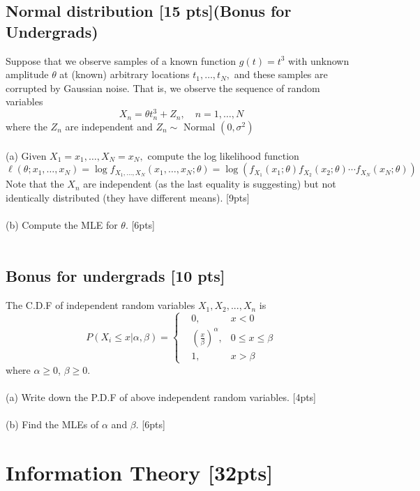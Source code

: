 \documentclass{article}
\begin{document}
\subsection{Normal distribution [15 pts](Bonus for Undergrads)}
Suppose that we observe samples of a known function $g(t)=t^{3}$ with unknown amplitude $\theta$ at (known) arbitrary locations $t_{1}, \ldots, t_{N},$ and these samples are corrupted by Gaussian noise. That is, we observe the sequence of random variables
$$
X_{n}=\theta t_{n}^{3}+Z_{n}, \quad n=1, \ldots, N
$$
where the $Z_{n}$ are independent and $Z_{n} \sim$ Normal $\left(0, \sigma^{2}\right)$\\\\
(a) Given $X_{1}=x_{1}, \ldots, X_{N}=x_{N},$ compute the log likelihood function
$$
\ell\left(\theta ; x_{1}, \ldots, x_{N}\right)=\log f_{X_{1}, \ldots, X_{N}}\left(x_{1}, \ldots, x_{N} ; \theta\right)=\log \left(f_{X_{1}}\left(x_{1} ; \theta\right) f_{X_{2}}\left(x_{2} ; \theta\right) \cdots f_{X_{N}}\left(x_{N} ; \theta\right)\right)
$$
Note that the $X_{n}$ are independent (as the last equality is suggesting) but not identically distributed (they have different means). [9pts]\\\\
(b) Compute the MLE for $\theta$. [6pts]\\\\

\subsection{Bonus for undergrads [10 pts]}
The C.D.F of independent random variables $X_{1}, X_{2},..., X_{n}$ is 
$$P(X_{i}\leq x| \alpha, \beta)=\left\{
\begin{aligned}
&0, & x < 0 \\
&(\frac{x}{\beta})^{\alpha}, & 0\leq x \leq \beta \\
&1, &x> \beta
\end{aligned}
\right.$$
where $\alpha \geq 0$, $\beta \geq 0$. \\\\
(a) Write down the P.D.F of above independent random variables. [4pts]\\\\
(b) Find the MLEs of $\alpha$ and $\beta$. [6pts]\\

\section{Information Theory [32pts]}
\end{document}
